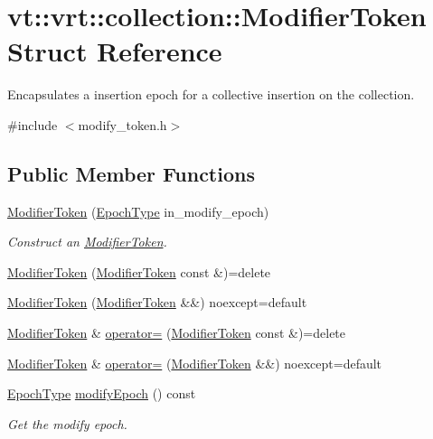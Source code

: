 \hypertarget{structvt_1_1vrt_1_1collection_1_1_modifier_token}{}\section{vt\+:\+:vrt\+:\+:collection\+:\+:Modifier\+Token Struct Reference}
\label{structvt_1_1vrt_1_1collection_1_1_modifier_token}


Encapsulates a insertion epoch for a collective insertion on the collection.  




{\ttfamily \#include $<$modify\+\_\+token.\+h$>$}

\subsection*{Public Member Functions}
\begin{DoxyCompactItemize}
\item 
\hyperlink{structvt_1_1vrt_1_1collection_1_1_modifier_token_a6c0d5fed4a1575396c0e2f6656cffd75}{Modifier\+Token} (\hyperlink{namespacevt_a985a5adf291c34a3ca263b3378388236}{Epoch\+Type} in\+\_\+modify\+\_\+epoch)
\begin{DoxyCompactList}\small\item\em Construct an {\ttfamily \hyperlink{structvt_1_1vrt_1_1collection_1_1_modifier_token}{Modifier\+Token}}. \end{DoxyCompactList}\item 
\hyperlink{structvt_1_1vrt_1_1collection_1_1_modifier_token_a4aa2f4483c7361fb217299825fc58824}{Modifier\+Token} (\hyperlink{structvt_1_1vrt_1_1collection_1_1_modifier_token}{Modifier\+Token} const \&)=delete
\item 
\hyperlink{structvt_1_1vrt_1_1collection_1_1_modifier_token_ad28f1fc8ed13262f976b9c4b6bd89510}{Modifier\+Token} (\hyperlink{structvt_1_1vrt_1_1collection_1_1_modifier_token}{Modifier\+Token} \&\&) noexcept=default
\item 
\hyperlink{structvt_1_1vrt_1_1collection_1_1_modifier_token}{Modifier\+Token} \& \hyperlink{structvt_1_1vrt_1_1collection_1_1_modifier_token_ae5bb7550e56586506bf2823603023109}{operator=} (\hyperlink{structvt_1_1vrt_1_1collection_1_1_modifier_token}{Modifier\+Token} const \&)=delete
\item 
\hyperlink{structvt_1_1vrt_1_1collection_1_1_modifier_token}{Modifier\+Token} \& \hyperlink{structvt_1_1vrt_1_1collection_1_1_modifier_token_a781c57243819fb3bd6f37b60f97faf0a}{operator=} (\hyperlink{structvt_1_1vrt_1_1collection_1_1_modifier_token}{Modifier\+Token} \&\&) noexcept=default
\item 
\hyperlink{namespacevt_a985a5adf291c34a3ca263b3378388236}{Epoch\+Type} \hyperlink{structvt_1_1vrt_1_1collection_1_1_modifier_token_a2a87237f09095f3284a5ebea7b9976e9}{modify\+Epoch} () const
\begin{DoxyCompactList}\small\item\em Get the modify epoch. \end{DoxyCompactList}\end{DoxyCompactItemize}
